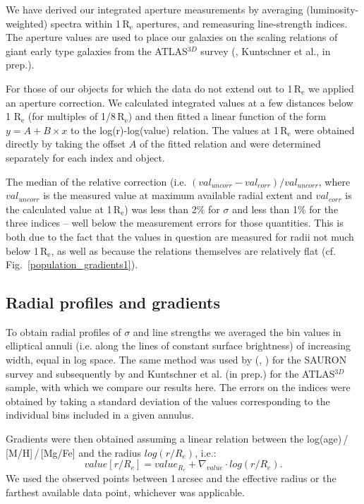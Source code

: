 \documentclass[useAMS,usenatbib]{mn2e}
\newcommand{\re}{$\mathrm{R_e}$}
\newcommand{\sig}{$\sigma$}
\begin{document}
We have derived our integrated aperture measurements by averaging (luminosity-weighted) spectra within 1\,{\re} apertures, and remeasuring line-strength indices. The  aperture values are used to place our galaxies on the scaling relations of giant early type galaxies from the ATLAS$^{3D}$ survey (\citealt{mcdermid:2015}, Kuntschner et al., in prep.).

For those of our objects for which the data do not extend out to 1\,{\re} we applied an aperture correction. We calculated integrated values at a few distances below 1 {\re} (for multiples of 1/8\,\re) and then fitted a linear function of the form $y = A + B \times x$ to the log(r)-log(value) relation. The values at 1\,{\re} were obtained directly by taking the offset $A$ of the fitted relation and were determined separately for each index and object. 

The median of the relative correction (i.e. $(val_{uncorr}-val_{corr})/val_{uncorr}$, where $val_{uncorr}$ is the measured value at maximum available radial extent and $val_{corr}$ is the calculated value at 1\,\re) was less than 2\% for {\sig} and less than 1\% for the three indices -- well below the measurement errors for those quantities. This is both due to the fact that the values in question are measured for radii not much below 1\,\re, as well as because the relations themselves are relatively flat (cf. Fig.~\ref{population_gradients1}).

\subsection{Radial profiles and gradients}

To obtain radial profiles of {\sig} and line strengths we averaged the bin values in elliptical annuli (i.e. along the lines of constant surface brightness) of increasing width, equal in log space. The same method was used by \citeauthor{kuntschner:2006} (\citeyear{kuntschner:2006}, \citeyear{kuntschner:2010}) for the SAURON survey and subsequently by \cite{scott:2013} and Kuntschner et al. (in prep.) for the ATLAS$^{3D}$ sample, with which we compare our results here. The errors on the indices were obtained by taking a standard deviation of the values corresponding to the individual bins included in a given annulus.

Gradients were then obtained assuming a linear relation between the log(age)\,/\,[M/H]\,/\,[Mg/Fe] and the radius $log(r/R_{e})$, i.e.: 
\begin{equation}
 value[r/R_e] = value_{R_e} + \nabla_{value} \cdot log(r/R_e).
\end{equation}
We used the observed points between 1\,arcsec and the effective radius or the farthest available data point, whichever was applicable.
\end{document}
